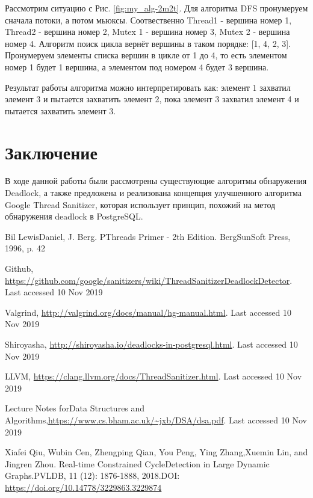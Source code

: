 \documentclass[runningheads, extrasrussian]{llncs}
\begin{document}
Рассмотрим ситуацию с Рис. \ref{fig:my_alg-2m2t}. Для алгоритма DFS пронумеруем сначала потоки, а потом мьюксы. Соотвественно Thread1 - вершина номер 1, Thread2 - вершина номер 2, Mutex 1 - вершина номер 3,  Mutex 2 - вершина номер 4. Алгоритм поиск цикла вернёт вершины в таком порядке: [1, 4, 2, 3]. Пронумеруем элементы списка вершин в цикле от 1 до 4, то есть элементом номер 1 будет 1 вершина, а элементом под номером 4 будет 3 вершина.

Результат работы алгоритма можно интерпретировать как: элемент 1 захватил элемент 3 и пытается захватить элемент 2, пока элемент 3 захватил элемент 4 и пытается захватить элемент 3.

\section{Заключение}

В ходе данной работы были рассмотрены существующие алгоритмы обнаружения Deadlock, а также предложена и реализована концепция улучшенного алгоритма Google Thread Sanitizer, которая использует принцип, похожий на метод обнаружения deadlock в PostgreSQL.

\begin{thebibliography}{8}
Bil LewisDaniel, J. Berg. PThreads Primer - 2th Edition. BergSunSoft Press, 1996, p. 42

Github, \url{https://github.com/google/sanitizers/wiki/ThreadSanitizerDeadlockDetector}.  Last accessed 10 Nov 2019

Valgrind, \url{http://valgrind.org/docs/manual/hg-manual.html}. Last accessed 10 Nov 2019

Shiroyasha, \url{http://shiroyasha.io/deadlocks-in-postgresql.html}. Last accessed 10 Nov 2019 

LLVM, \url{https://clang.llvm.org/docs/ThreadSanitizer.html}. Last accessed 10 Nov 2019 

Lecture Notes forData Structures and Algorithms,\url{https://www.cs.bham.ac.uk/~jxb/DSA/dsa.pdf}. Last accessed 10 Nov 2019

Xiafei Qiu, Wubin Cen, Zhengping Qian, You Peng, Ying Zhang,Xuemin Lin, and Jingren Zhou.  Real-time Constrained CycleDetection in Large Dynamic Graphs.PVLDB, 11 (12): 1876-1888, 2018.DOI: \url{https://doi.org/10.14778/3229863.3229874}
\end{thebibliography}
\end{document}
